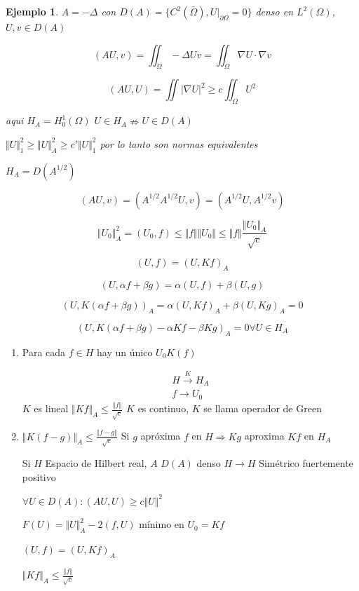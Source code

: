 \documentclass[a4paper,10pt]{book}
\newtheorem{ejemplo}{Ejemplo}
\begin{document}
\begin{ejemplo}
    $A= -\Delta$ con $D(A) =\{  C^2 (\bar{\Omega}), U|_{\partial \Omega } =0  \}$ denso en $L^2(\Omega)$,
    $U,v\in D(A)$

    \[(AU,v) = \iint_\Omega -\Delta U  v = \iint_\Omega \nabla U\cdot \nabla v \]


    \[
    (AU,U)= \iint |\nabla U|^2 \geq c\iint_\Omega U^2
    \]

     aqui $H_A= H_0^1(\Omega) $ $U\in H_A \nRightarrow  U\in D(A)$

     
     $\Vert U\Vert_1^2 \geq \Vert U\Vert_A^2 \geq c'\Vert U\Vert_1^2$ por lo tanto son normas equivalentes

      $H_A= D(A^{1/2})$ 

      \[
      (AU,v)= (A^{1/2} A^{1/2} U,v) =(A^{1/2}U,A^{1/2}v) 
      \]

      \[
      \Vert U_0 \Vert_A^2 = (U_0,f)\leq \Vert f\Vert \Vert U_0\Vert \leq \Vert f\Vert \frac{\Vert U_0\Vert_A}{\sqrt{c}}
      \]

      \[
      (U,f)=(U,Kf)_A
      \]

      \[
      (U,\alpha f +\beta g)= \alpha (U,f)+\beta (U,g)
      \]

      \[
      (U,K(\alpha f + \beta g) )_A = \alpha (U,K f)_A +\beta (U ,K g)_A =0
      \]

      \[
      (U , K(\alpha f+\beta g) -\alpha K f-\beta K g)_A =0 \forall U\in H_A
      \]

      
\end{ejemplo}

\begin{enumerate}
    \item Para cada $f\in H $ hay un único $U_0 K(f)$
        
     \begin{align*}
     H\overset{K}{\rightarrow} H_A \\
     f\rightarrow U_0
     \end{align*}    
     $K$ es lineal  $\Vert Kf\Vert_A \leq \frac{\Vert f\Vert}{\sqrt{c}} $ $K$ es continuo, $K$ se llama operador de Green

     \item  $\Vert K(f-g) \Vert_A \leq \frac{\Vert f-g\Vert}{\sqrt{c}}$ Si $g$ apróxima $f$ en $H\Rightarrow Kg$ aproxima $Kf$ en $H_A$ 

     Si $H$ Espacio de Hilbert real, $A$ $D(A)$ denso $H\rightarrow H$ Simétrico fuertemente positivo

     $\forall U \in D(A) : (AU,U) \geq c \Vert U \Vert^2$

     $F(U) = \Vert U \Vert_A^2 -2(f,U)$ mínimo en $U_0 = K f$

     $(U,f)= (U,Kf)_A$

     $\Vert Kf\Vert_A \leq \frac{\Vert f\Vert}{\sqrt{c}}$
 \end{enumerate}
\end{document}
